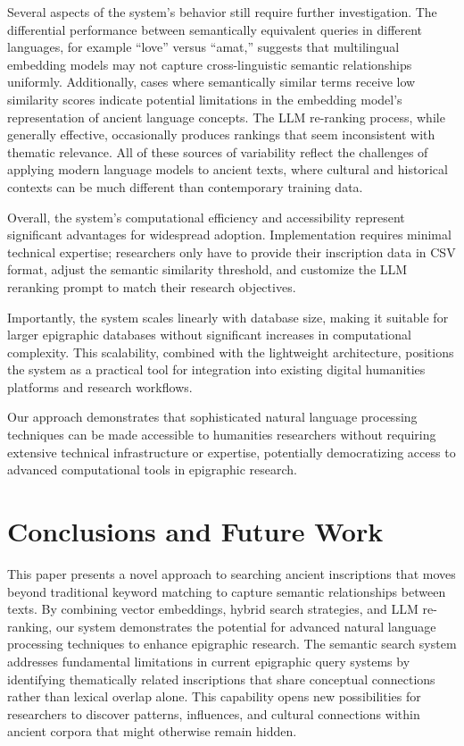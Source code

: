 \documentclass[final,greek,american]{anthology-ch}
\begin{document}
Several aspects of the system's behavior still require further investigation. The differential performance between semantically equivalent queries in different languages, for example ``love'' versus ``amat,'' suggests that multilingual embedding models may not capture cross-linguistic semantic relationships uniformly. Additionally, cases where semantically similar terms receive low similarity scores indicate potential limitations in the embedding model's representation of ancient language concepts. The LLM re-ranking process, while generally effective, occasionally produces rankings that seem inconsistent with thematic relevance. All of these sources of variability reflect the challenges of applying modern language models to ancient texts, where cultural and historical contexts can be much different than contemporary training data.

Overall, the system's computational efficiency and accessibility represent significant advantages for widespread adoption. Implementation requires minimal technical expertise; researchers only have to provide their inscription data in CSV format, adjust the semantic similarity threshold, and customize the LLM reranking prompt to match their research objectives.

Importantly, the system scales linearly with database size, making it suitable for larger epigraphic databases without significant increases in computational complexity. This scalability, combined with the lightweight architecture, positions the system as a practical tool for integration into existing digital humanities platforms and research workflows.

Our approach demonstrates that sophisticated natural language processing techniques can be made accessible to humanities researchers without requiring extensive technical infrastructure or expertise, potentially democratizing access to advanced computational tools in epigraphic research.
\FloatBarrier

\section{Conclusions and Future Work}
This paper presents a novel approach to searching ancient inscriptions that moves beyond traditional keyword matching to capture semantic relationships between texts. By combining vector embeddings, hybrid search strategies, and LLM re-ranking, our system demonstrates the potential for advanced natural language processing techniques to enhance epigraphic research. The semantic search system addresses fundamental limitations in current epigraphic query systems by identifying thematically related inscriptions that share conceptual connections rather than lexical overlap alone. This capability opens new possibilities for researchers to discover patterns, influences, and cultural connections within ancient corpora that might otherwise remain hidden.
\end{document}
